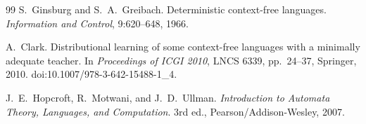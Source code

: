\documentclass[11pt,a4paper]{ltjsarticle}
\theoremstyle{remark}
\theoremstyle{plain}
\begin{document}
\begin{thebibliography}{99}
S.~Ginsburg and S.~A.~Greibach.
\newblock Deterministic context-free languages.
\newblock \emph{Information and Control}, 9:620--648, 1966.

A.~Clark.
\newblock Distributional learning of some context-free languages with a
minimally adequate teacher.
\newblock In \emph{Proceedings of ICGI 2010}, LNCS 6339, pp.~24--37,
Springer, 2010.
doi:10.1007/978-3-642-15488-1\_4.

J.~E.~Hopcroft, R.~Motwani, and J.~D.~Ullman.
\newblock \emph{Introduction to Automata Theory, Languages, and Computation}.
\newblock 3rd ed., Pearson/Addison-Wesley, 2007.

\end{thebibliography}
\end{document}
